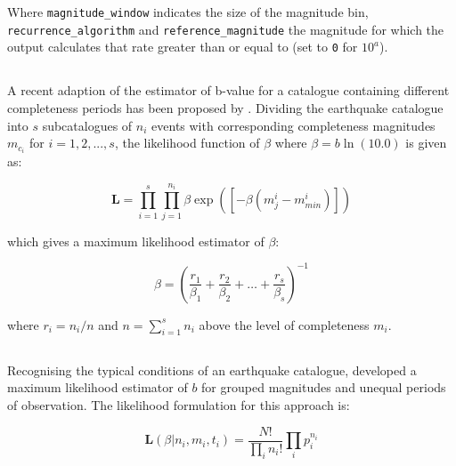 Where \verb=magnitude_window= indicates the size of the magnitude bin, \verb=recurrence_algorithm= and \verb=reference_magnitude= the magnitude for which the output calculates that rate greater than or equal to (set to \verb=0= for $10^{a}$). 

\subsection{\cite{KijkoSmit2012}}

A recent adaption of the \cite{Aki1965} estimator of b-value for  a catalogue containing different completeness periods has been proposed by \cite{KijkoSmit2012}. Dividing the earthquake catalogue into $s$ subcatalogues of $n_i$ events with corresponding completeness magnitudes $m_{c_i}$ for $i = 1, 2, ..., s$, the likelihood function of $\beta$ where $\beta = b \ln		 \left( {10.0} \right)$ is given as:

\begin{equation}
    \mathbf{L} = \prod_{i = 1}^{s} \prod_{j = 1}^{n_i} \beta \exp(\left[ {-\beta \left( {m_j^i - m_{min}^i } \right) } \right])
\end{equation}

\noindent which gives a maximum likelihood estimator of $\beta$:

\begin{equation}
    \beta = \left( {\frac{r_1}{\beta_1} + \frac{r_2}{\beta_2} + \dots + \frac{r_s}{\beta_s}} \right)^{-1}
\end{equation}

\noindent where $r_i = n_i / n$ and $n = \sum_{i = 1}^{s} n_i$ above the level of completeness $m_i$.

\begin{python}[frame=single]]

>> kijko_smit_config = {'magnitude_interval': 0.1,
                        'reference_magnitude': None\}
\end{python}

\subsection{\cite{Weichert1980}}

Recognising the typical conditions of an earthquake catalogue, \cite{Weichert1980} developed a maximum likelihood estimator of $b$ for grouped magnitudes and unequal periods of observation. The likelihood formulation for this approach is:

\begin{equation}
   \mathbf{L} \left( {\beta | n_i, m_i, t_i} \right) = \frac{ N!}{\prod_i n_i!} \prod_i p_{i}^{n_i}
\end{equation}

